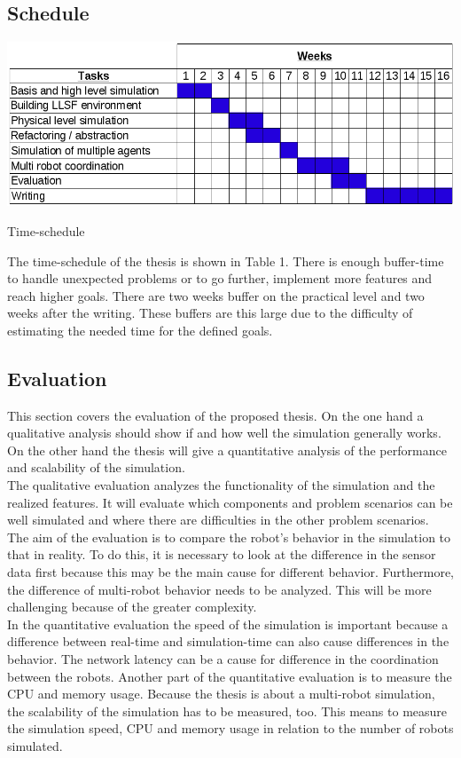 \documentclass[a4paper,11pt,hidelinks]{article}
\begin{document}
\subsection{Schedule}
\begin{table}
\centering
\includegraphics[scale=0.45]{pics/Schedule.png}
\label{Table 1}
\caption{Time-schedule}
\end{table}

The time-schedule of the thesis is shown in Table 1. There is enough buffer-time to handle unexpected problems or to go further, implement more features and reach higher goals. There are two weeks buffer on the practical level and two weeks after the writing. These buffers are this large due to the difficulty of estimating the needed time for the defined goals.

\subsection{Evaluation}
This section covers the evaluation of the proposed thesis. On the one hand a qualitative analysis should show if and how well the simulation generally works. On the other hand the thesis will give a quantitative analysis of the performance and scalability of the simulation.\\
The qualitative evaluation analyzes the functionality of the simulation and the realized features. It will evaluate which components and problem scenarios can be well simulated and where there are difficulties in the other problem scenarios. The aim of the evaluation is to compare the robot's behavior in the simulation to that in reality. To do this, it is necessary to look at the difference in the sensor data first because this may be the main cause for different behavior. Furthermore, the difference of multi-robot behavior needs to be analyzed. This will be more challenging because of the greater complexity.\\
In the quantitative evaluation the speed of the simulation is important because a difference between real-time and simulation-time can also cause differences in the behavior. The network latency can be a cause for difference in the coordination between the robots. Another part of the quantitative evaluation is to measure the CPU and memory usage. Because the thesis is about a multi-robot simulation, the scalability of the simulation has to be measured, too. This means to measure the simulation speed, CPU and memory usage in relation to the number of robots simulated.
\end{document}
